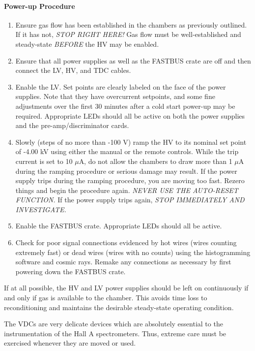 \paragraph{Power-up Procedure}

\begin{enumerate}
\item {Ensure gas flow has been established in the chambers as
previously outlined.  If it has not, {\it STOP RIGHT
HERE!}  Gas flow must be well-established and steady-state
{\it BEFORE} the HV may be enabled.}
\item {Ensure that all power supplies as well as the FASTBUS crate
are off and then connect the LV, HV, and TDC cables.}
\item {Enable the LV.  Set points are clearly labeled on the face of
the power supplies.  Note that they have overcurrent setpoints, and
some fine adjustments over the first 30 minutes after a cold start
power-up may be required.  Appropriate LEDs should all be active on
both the power supplies and the pre-amp/discriminator cards.}
\item {Slowly (steps of no more than -100 V) ramp the HV to its
nominal set point of -4.00 kV using either the manual or the remote
controls.   While the trip current is set to 10 $\mu$A, do not allow
the chambers to draw more than 1 $\mu$A during the ramping procedure
or serious damage may result.  If the power supply trips during the
ramping procedure, you are moving too fast.  Rezero things and begin
the procedure again.  {\it NEVER USE THE AUTO-RESET FUNCTION.}}  If
the power supply trips again, {\it STOP IMMEDIATELY AND INVESTIGATE.}
\item {Enable the FASTBUS crate.  Appropriate LEDs should all be
active.}
\item {Check for poor signal connections evidenced by hot wires (wires
counting extremely fast) or dead wires (wires with no counts) using
the histogramming software and cosmic rays.  Remake any connections as
necessary by first powering down the FASTBUS crate.}
\end{enumerate}

If at all possible, the HV and LV power supplies should be left
on continuously if and only if gas is available to the chamber.  This
avoids time loss to reconditioning and maintains the desirable
steady-state operating condition.


The VDCs are very delicate devices which are absolutely essential to
the instrumentation of the Hall A spectrometers.  Thus, extreme care
must be exercised whenever they are moved or used.

